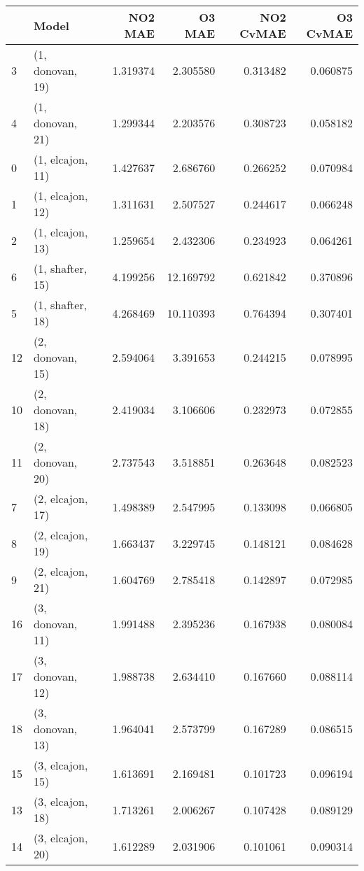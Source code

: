 \begin{tabular}{llrrrr}
\toprule
{} &             Model &   NO2 MAE &     O3 MAE &  NO2 CvMAE &  O3 CvMAE \\
\midrule
3  &  (1, donovan, 19) &  1.319374 &   2.305580 &   0.313482 &  0.060875 \\
4  &  (1, donovan, 21) &  1.299344 &   2.203576 &   0.308723 &  0.058182 \\
0  &  (1, elcajon, 11) &  1.427637 &   2.686760 &   0.266252 &  0.070984 \\
1  &  (1, elcajon, 12) &  1.311631 &   2.507527 &   0.244617 &  0.066248 \\
2  &  (1, elcajon, 13) &  1.259654 &   2.432306 &   0.234923 &  0.064261 \\
6  &  (1, shafter, 15) &  4.199256 &  12.169792 &   0.621842 &  0.370896 \\
5  &  (1, shafter, 18) &  4.268469 &  10.110393 &   0.764394 &  0.307401 \\
12 &  (2, donovan, 15) &  2.594064 &   3.391653 &   0.244215 &  0.078995 \\
10 &  (2, donovan, 18) &  2.419034 &   3.106606 &   0.232973 &  0.072855 \\
11 &  (2, donovan, 20) &  2.737543 &   3.518851 &   0.263648 &  0.082523 \\
7  &  (2, elcajon, 17) &  1.498389 &   2.547995 &   0.133098 &  0.066805 \\
8  &  (2, elcajon, 19) &  1.663437 &   3.229745 &   0.148121 &  0.084628 \\
9  &  (2, elcajon, 21) &  1.604769 &   2.785418 &   0.142897 &  0.072985 \\
16 &  (3, donovan, 11) &  1.991488 &   2.395236 &   0.167938 &  0.080084 \\
17 &  (3, donovan, 12) &  1.988738 &   2.634410 &   0.167660 &  0.088114 \\
18 &  (3, donovan, 13) &  1.964041 &   2.573799 &   0.167289 &  0.086515 \\
15 &  (3, elcajon, 15) &  1.613691 &   2.169481 &   0.101723 &  0.096194 \\
13 &  (3, elcajon, 18) &  1.713261 &   2.006267 &   0.107428 &  0.089129 \\
14 &  (3, elcajon, 20) &  1.612289 &   2.031906 &   0.101061 &  0.090314 \\
\bottomrule
\end{tabular}
